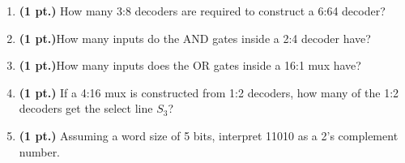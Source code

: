 \documentclass{article}
\begin{document}
\begin{enumerate}
\item {\bf (1 pt.)} How many 3:8 decoders are required to construct a 6:64 decoder?

\item {\bf (1 pt.)}How many inputs do the AND gates inside a 2:4 decoder have?

\item {\bf (1 pt.)}How many inputs does the OR gates inside a 16:1 mux have?

\pagebreak{}
\item {\bf (1 pt.)} If a 4:16 mux is constructed from 1:2 decoders, how
many of the 1:2 decoders get the select line $S_3$?

\item {\bf (1 pt.)} Assuming a word size of 5 bits, interpret 11010 as a 2's complement
number.



\end{enumerate}
\end{document}
